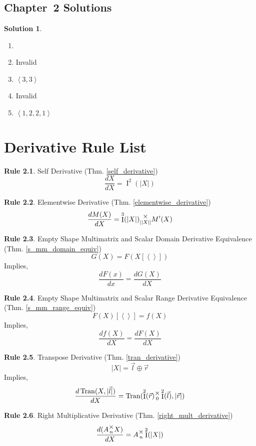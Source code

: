 \documentclass[12pt]{book}
\theoremstyle{plain}
\theoremstyle{definition}
\newtheorem{drule}{Rule}
\theoremstyle{ppart}
\theoremstyle{case}
\newcounter{solutionctr}
\theoremstyle{solution}
\newtheorem{solution}{Solution}
\newcommand{\solutionsection}[1]{
  \section{Chapter~#1 Solutions}\setcounter{solutionctr}{0}}
\DeclareMathOperator{\Ident}{I}
\DeclareMathOperator{\Tran}{Tran}
\newcommand{\mmult}[1]{\text{\raisebox{1ex}{$\underset{#1}{\times}$}}}
\begin{document}
\begin{appendices}
\solutionsection{2}

\begin{solution}
\begin{enumerate}
\item[]
\item Invalid
\item $\left<3, 3\right>$
\item Invalid
\item $\left<1, 2, 2, 1\right>$
\end{enumerate}
\end{solution}

\chapter{Derivative Rule List}

\begin{drule}
Self Derivative (Thm. \ref{self_derivative})
\[ \frac{dX}{dX} = \Ident^2(|X|) \]
\end{drule}

\begin{drule}
Elementwise Derivative (Thm. \ref{elementwise_derivative})
\[ \frac{dM(X)}{dX} = \Ident^3(|X|) \mmult{||X||} M'(X) \]
\end{drule}

\begin{drule}
Empty Shape Multimatrix and Scalar Domain Derivative Equivalence
(Thm. \ref{s_mm_domain_equiv})
\[ G(X) = F(X[\left<\right>]) \]
Implies,
\[ \frac{dF(x)}{dx} = \frac{dG(X)}{dX} \]
\end{drule}

\begin{drule}
Empty Shape Multimatrix and Scalar Range Derivative Equivalence
(Thm. \ref{s_mm_range_equiv})
\[ F(X)[\left<\right>] = f(X) \]
Implies,
\[ \frac{df(X)}{dX} = \frac{dF(X)}{dX} \]
\end{drule}

\begin{drule}
Transpose Derivative
(Thm. \ref{tran_derivative})
\[ |X| = \vec{l} \oplus \vec{r} \]
Implies,
\[
 \frac{d\Tran(X, |\vec{l}|)}{dX} =
 \Tran(\Ident^2(\vec{r}) \mmult{0} \Ident^2(\vec{l}), |\vec{r}|)
\]
\end{drule}

\begin{drule}
Right Multiplicative Derivative
(Thm. \ref{right_mult_derivative})
\[ \frac{d(A \mmult{n} X)}{dX} = A \mmult{n} \Ident^2(|X|) \]
\end{drule}


\end{appendices}
\end{document}
